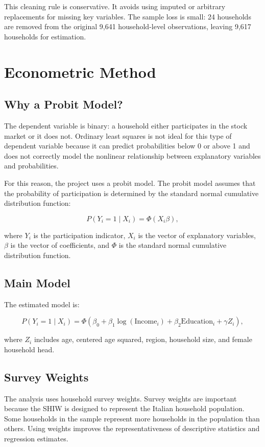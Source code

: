 \documentclass[12pt]{article}
\begin{document}
This cleaning rule is conservative. It avoids using imputed or arbitrary replacements for missing key variables. The sample loss is small: 24 households are removed from the original 9,641 household-level observations, leaving 9,617 households for estimation.

\section{Econometric Method}

\subsection{Why a Probit Model?}

The dependent variable is binary: a household either participates in the stock market or it does not. Ordinary least squares is not ideal for this type of dependent variable because it can predict probabilities below 0 or above 1 and does not correctly model the nonlinear relationship between explanatory variables and probabilities.

For this reason, the project uses a probit model. The probit model assumes that the probability of participation is determined by the standard normal cumulative distribution function:

\[
P(Y_i = 1 \mid X_i) =
\Phi(X_i \beta),
\]

where \(Y_i\) is the participation indicator, \(X_i\) is the vector of explanatory variables, \(\beta\) is the vector of coefficients, and \(\Phi\) is the standard normal cumulative distribution function.

\subsection{Main Model}

The estimated model is:

\[
P(Y_i = 1 \mid X_i) =
\Phi(\beta_0 + \beta_1 \log(\text{Income}_i)
+ \beta_2 \text{Education}_i + \gamma Z_i),
\]

where \(Z_i\) includes age, centered age squared, region, household size, and female household head.

\subsection{Survey Weights}

The analysis uses household survey weights. Survey weights are important because the SHIW is designed to represent the Italian household population. Some households in the sample represent more households in the population than others. Using weights improves the representativeness of descriptive statistics and regression estimates.
\end{document}
